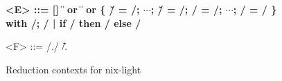 \begin{figure}
  \begin{grammar}
    \bfseries
    <E> ::= [] \|  
    \alt {} \|  or  \|  \|  or 
    \alt \{ \v/ = \e/; $\cdots{}$; \v/ = \e/; \E/ = \e/; $\cdots{}$; \e/ = \e/ \}
    \alt with \E/; \e/ | if \E/ then \e/ else \e/

    <F> ::= \E/.\a/ \| \v/.
  \end{grammar}
  \caption{Reduction contexts for nix-light\label{fig:semantics:nix-light:reduction-contexts}}
\end{figure}
